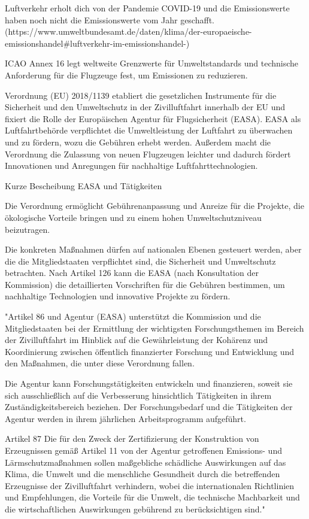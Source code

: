 Luftverkehr erholt dich von der Pandemie COVID-19 und die Emissionswerte haben noch nicht die Emissionswerte vom Jahr geschafft.
 (https://www.umweltbundesamt.de/daten/klima/der-europaeische-emissionshandel#luftverkehr-im-emissionshandel-)

ICAO Annex 16 legt weltweite Grenzwerte für Umweltstandards und technische Anforderung für die Flugzeuge fest, um Emissionen zu reduzieren.

Verordnung (EU) 2018/1139 etabliert die gesetzlichen Instrumente für die Sicherheit und den Umweltschutz in der Zivilluftfahrt innerhalb der EU 
und fixiert die Rolle der Europäischen Agentur für Flugsicherheit (EASA). EASA als Luftfahrtbehörde verpflichtet die 
Umweltleistung der Luftfahrt zu überwachen und zu fördern, wozu die Gebühren erhebt werden. Außerdem macht die Verordnung die Zulassung von
neuen Flugzeugen leichter und dadurch fördert Innovationen und Anregungen für nachhaltige Luftfahrttechnologien.

Kurze Bescheibung EASA und Tätigkeiten

Die Verordnung ermöglicht Gebührenanpassung und Anreize für die Projekte, die ökologische Vorteile bringen und 
zu einem hohen Umweltschutzniveau beizutragen.

Die konkreten Maßnahmen dürfen auf nationalen Ebenen gesteuert werden, aber die die Mitgliedstaaten verpflichtet sind, 
die Sicherheit und Umweltschutz betrachten. Nach Artikel 126 kann die EASA (nach Konsultation der Kommission) die detaillierten 
Vorschriften für die Gebühren bestimmen, um nachhaltige Technologien und innovative Projekte zu fördern.

"Artikel 86
und Agentur (EASA) unterstützt die Kommission und die Mitgliedstaaten bei der Ermittlung der wichtigsten 
Forschungsthemen im Bereich der Zivilluftfahrt im Hinblick auf die Gewährleistung der Kohärenz und Koordinierung
zwischen öffentlich finanzierter Forschung und Entwicklung und den Maßnahmen, die unter diese Verordnung fallen.

Die Agentur kann Forschungstätigkeiten entwickeln und finanzieren, soweit sie sich ausschließlich auf die
Verbesserung hinsichtlich Tätigkeiten in ihrem Zuständigkeitsbereich beziehen. Der Forschungsbedarf und die Tätigkeiten
der Agentur werden in ihrem jährlichen Arbeitsprogramm aufgeführt. 

Artikel 87
Die für den Zweck der Zertifizierung der Konstruktion von Erzeugnissen gemäß Artikel 11 von der Agentur
getroffenen Emissions- und Lärmschutzmaßnahmen sollen maßgebliche schädliche Auswirkungen auf das Klima, die
Umwelt und die menschliche Gesundheit durch die betreffenden Erzeugnisse der Zivilluftfahrt verhindern, wobei die
internationalen Richtlinien und Empfehlungen, die Vorteile für die Umwelt, die technische Machbarkeit und die
wirtschaftlichen Auswirkungen gebührend zu berücksichtigen sind."


